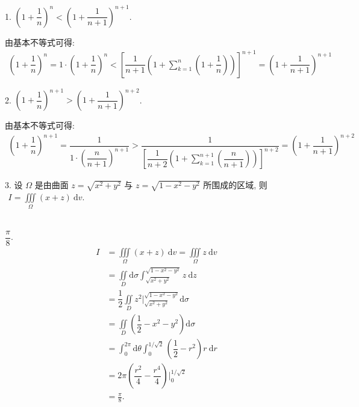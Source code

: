 \documentclass[lang=cn,12pt]{elegantbook}
\begin{document}
\newpage



1. $\left(1+\dfrac{1}{n}\right)^n < \left(1 + \dfrac{1}{n+1}\right)^{n+1}$.
\newline

\begin{solution}
  由基本不等式可得:
  $$\begin{aligned}
  \left(1+\dfrac{1}{n}\right)^n = 1 \cdot \left(1+\dfrac{1}{n}\right)^n
  < \left[\dfrac{1}{n+1}\left(1+\sum_{k=1}^{n}\left(1 + \dfrac{1}{n}\right)\right)\right]^{n+1}
  = \left(1+\dfrac{1}{n+1}\right)^{n+1}
  \end{aligned}$$
\end{solution}

\vspace{1cm}
2. $\left(1+\dfrac{1}{n}\right)^{n+1} > \left(1 + \dfrac{1}{n+1}\right)^{n+2}$.
\newline

\begin{solution}
  由基本不等式可得:
  $$\begin{aligned}
    \left(1+\dfrac{1}{n}\right)^{n+1} = \dfrac{1}{1 \cdot \left(\dfrac{n}{n+1}\right)^{n+1}}
    > \dfrac{1}{\left[\dfrac{1}{n+2}\left(1+\displaystyle\sum_{k=1}^{n+1}
      \left(\dfrac{n}{n+1}\right)\right)\right]^{n+2}}
    = \left(1 + \dfrac{1}{n+1}\right)^{n+2}
  \end{aligned}$$
\end{solution}

3. 设 $\Omega$ 是由曲面 $z=\sqrt{x^2+y^2}$ 与 $z=\sqrt{1-x^2-y^2}$ 所围成的区域, 则
$\begin{aligned}
	I=\iiint\limits_{\Omega} (x+z) \mathrm{~d} v.
\end{aligned}$
\\ \\

\begin{solution}
    $\dfrac{\pi}{8}.$
    $$\begin{aligned}
        I&=\iiint\limits_{\Omega} (x+z) \mathrm{~d} v=\iiint\limits_{\Omega} z \mathrm{~d} v\\
        &=\iint\limits_{D} \mathrm{d} \sigma \int_{\sqrt{x^2+y^2}}^{\sqrt{1-x^2-y^2}}
		    z \mathrm{~d} z\\
	    &=\dfrac{1}{2}\iint\limits_{D} z^2\bigg|_{\sqrt{x^2+y^2}}^{\sqrt{1-x^2-y^2}}\mathrm{d} \sigma\\
		&=\iint\limits_{D} \left(\dfrac{1}{2} - x^2 - y^2\right) \mathrm{d} \sigma\\
		&=\int_{0}^{2\pi} \mathrm{d} \theta \int_{0}^{1/\sqrt{2}}
		    \left(\dfrac{1}{2} - r^2\right)r \mathrm{~d} r\\
		&=2\pi \left(\dfrac{r^2}{4}-\dfrac{r^4}{4}\right)\bigg|_{0}^{1/\sqrt{2}}\\
		&=\frac{\pi}{8}.
	\end{aligned}$$
\end{solution}
\end{document}
